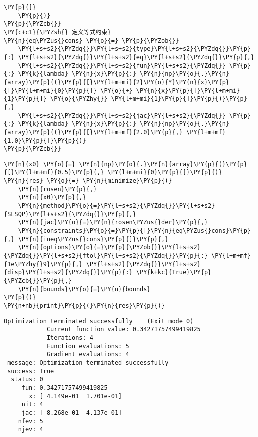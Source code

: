 \begin{tcolorbox}[breakable, size=fbox, boxrule=1pt, pad at break*=1mm,colback=cellbackground, colframe=cellborder]
\begin{Verbatim}[commandchars=\\\{\}]
        \PY{p}{]}
    \PY{p}{)}
\PY{p}{\PYZcb{}}
\PY{c+c1}{\PYZsh{} 定义等式约束}
\PY{n}{eq\PYZus{}cons} \PY{o}{=} \PY{p}{\PYZob{}}
    \PY{l+s+s2}{\PYZdq{}}\PY{l+s+s2}{type}\PY{l+s+s2}{\PYZdq{}}\PY{p}{:} \PY{l+s+s2}{\PYZdq{}}\PY{l+s+s2}{eq}\PY{l+s+s2}{\PYZdq{}}\PY{p}{,}
    \PY{l+s+s2}{\PYZdq{}}\PY{l+s+s2}{fun}\PY{l+s+s2}{\PYZdq{}} \PY{p}{:} \PY{k}{lambda} \PY{n}{x}\PY{p}{:} \PY{n}{np}\PY{o}{.}\PY{n}{array}\PY{p}{(}\PY{p}{[}\PY{l+m+mi}{2}\PY{o}{*}\PY{n}{x}\PY{p}{[}\PY{l+m+mi}{0}\PY{p}{]} \PY{o}{+} \PY{n}{x}\PY{p}{[}\PY{l+m+mi}{1}\PY{p}{]} \PY{o}{\PYZhy{}} \PY{l+m+mi}{1}\PY{p}{]}\PY{p}{)}\PY{p}{,}
    \PY{l+s+s2}{\PYZdq{}}\PY{l+s+s2}{jac}\PY{l+s+s2}{\PYZdq{}} \PY{p}{:} \PY{k}{lambda} \PY{n}{x}\PY{p}{:} \PY{n}{np}\PY{o}{.}\PY{n}{array}\PY{p}{(}\PY{p}{[}\PY{l+m+mf}{2.0}\PY{p}{,} \PY{l+m+mf}{1.0}\PY{p}{]}\PY{p}{)}
\PY{p}{\PYZcb{}}
\end{Verbatim}
\end{tcolorbox}

    \begin{tcolorbox}[breakable, size=fbox, boxrule=1pt, pad at break*=1mm,colback=cellbackground, colframe=cellborder]
\begin{Verbatim}[commandchars=\\\{\}]
\PY{n}{x0} \PY{o}{=} \PY{n}{np}\PY{o}{.}\PY{n}{array}\PY{p}{(}\PY{p}{[}\PY{l+m+mf}{0.5}\PY{p}{,} \PY{l+m+mi}{0}\PY{p}{]}\PY{p}{)}
\PY{n}{res} \PY{o}{=} \PY{n}{minimize}\PY{p}{(}
    \PY{n}{rosen}\PY{p}{,} 
    \PY{n}{x0}\PY{p}{,} 
    \PY{n}{method}\PY{o}{=}\PY{l+s+s2}{\PYZdq{}}\PY{l+s+s2}{SLSQP}\PY{l+s+s2}{\PYZdq{}}\PY{p}{,} 
    \PY{n}{jac}\PY{o}{=}\PY{n}{rosen\PYZus{}der}\PY{p}{,}
    \PY{n}{constraints}\PY{o}{=}\PY{p}{[}\PY{n}{eq\PYZus{}cons}\PY{p}{,} \PY{n}{ineq\PYZus{}cons}\PY{p}{]}\PY{p}{,} 
    \PY{n}{options}\PY{o}{=}\PY{p}{\PYZob{}}\PY{l+s+s2}{\PYZdq{}}\PY{l+s+s2}{ftol}\PY{l+s+s2}{\PYZdq{}}\PY{p}{:} \PY{l+m+mf}{1e\PYZhy{}9}\PY{p}{,} \PY{l+s+s2}{\PYZdq{}}\PY{l+s+s2}{disp}\PY{l+s+s2}{\PYZdq{}}\PY{p}{:} \PY{k+kc}{True}\PY{p}{\PYZcb{}}\PY{p}{,}
    \PY{n}{bounds}\PY{o}{=}\PY{n}{bounds}
\PY{p}{)}
\PY{n+nb}{print}\PY{p}{(}\PY{n}{res}\PY{p}{)}
\end{Verbatim}
\end{tcolorbox}

    \begin{Verbatim}[commandchars=\\\{\}]
Optimization terminated successfully    (Exit mode 0)
            Current function value: 0.34271757499419825
            Iterations: 4
            Function evaluations: 5
            Gradient evaluations: 4
 message: Optimization terminated successfully
 success: True
  status: 0
     fun: 0.34271757499419825
       x: [ 4.149e-01  1.701e-01]
     nit: 4
     jac: [-8.268e-01 -4.137e-01]
    nfev: 5
    njev: 4
    \end{Verbatim}

